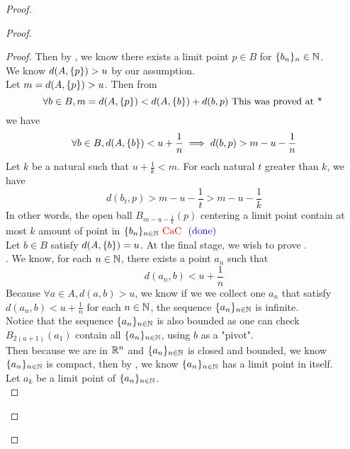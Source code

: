 \documentclass{report}
\begin{document}
\begin{proof}
\begin{proof}
\begin{proof}
Then by , we know there exists a limit point $p\in B$ for $\{ b_n \}_n\in\mathbb{N}$.\\

We know $d(A,\{ p \})>u$ by our assumption.\\

Let $m=d(A,\{ p \})>u$. Then from
\begin{equation}
\forall b\in B,m=d(A,\{ p \})<d(A,\{ b \})+d(b,p)\text{ This was proved at * }
\end{equation}
we have
\begin{equation}
\forall b\in B, d(A,\{ b \})<u+\frac{1}{n}\implies d(b,p)>m-u-\frac{1}{n}
\end{equation}
Let $k$ be a natural such that  $u+\frac{1}{k}<m$. For each natural $t$ greater than  $k$, we have 
\begin{equation}
d(b_t,p)>m-u-\frac{1}{t}>m-u-\frac{1}{k}
\end{equation}
In other words, the open ball $B_{m-u-\frac{1}{k}}(p)$ centering a limit point contain at most $k$ amount of point in  $\{ b_n \}_{n\in\mathbb{N}}\text{ \textcolor{red}{CaC} }\textcolor{blue}{\text{ (done) }}$\\

Let $b\in B$ satisfy $d(A,\{ b \})=u$. At the final stage, we wish to prove .\\

. We know, for each $n\in\mathbb{N}$, there exists a point $a_n$ such that 
\begin{equation}
d(a_n,b)<u+\frac{1}{n}
\end{equation}
Because $\forall a\in A, d(a,b)>u$, we know if we we collect one $a_n$ that satisfy  $d(a_n,b)<u+\frac{1}{n}$ for each $n\in\mathbb{N}$, the sequence $\{ a_n \}_{n\in\mathbb{N}}$ is infinite.\\

Notice that the sequence $\{ a_n \}_{n\in\mathbb{N}}$ is also bounded as one can check $B_{2(u+1)}(a_1)$ contain all $\{ a_n \}_{n\in\mathbb{N}}$, using $b$ as a "pivot".\\

Then because we are in $\mathbb{R}^n$ and $\{ a_n \}_{n\in\mathbb{N}}$ is closed and bounded, we know $\{ a_n \}_{n\in\mathbb{N}}$ is compact, then by , we know $\{ a_n \}_{n\in\mathbb{N}}$ has a limit point in itself.\\

Let $a_k$ be a limit point of $\{ a_n \}_{n\in\mathbb{N}}$.\\


\end{proof}
\end{proof}
\end{proof}
\end{document}
